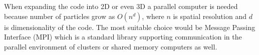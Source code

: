\documentclass[oneside,branding,toc,article]{sat}
\begin{document}
When expanding the code into 2D or even 3D a parallel computer is needed
because number of particles grow as $O(n^d)$, where $n$ is spatial resolution
and $d$ is dimensionality of the code.  The most suitable choice would be
Message Passing Interface (MPI) which is a standard library supporting
communication in the parallel environment of clusters or shared memory
computers as well.



\end{document}
